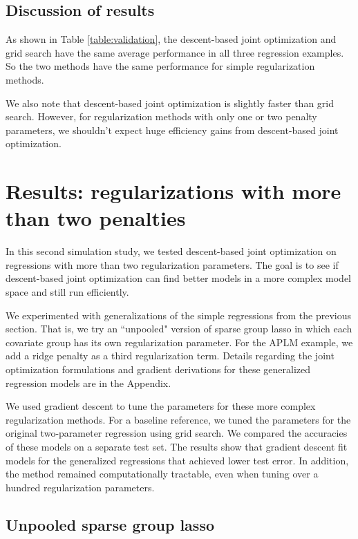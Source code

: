 \documentclass[10pt,letterpaper]{article}
\begin{document}
\subsection{Discussion of results}

As shown in Table \ref{table:validation}, the descent-based joint optimization and grid search have the same average performance in all three regression examples. So the two methods have the same performance for simple regularization methods.

We also note that descent-based joint optimization is slightly faster than grid search. However, for regularization methods with only one or two penalty parameters, we shouldn't expect huge efficiency gains from descent-based joint optimization.

\section{Results: regularizations with more than two penalties}

In this second simulation study, we tested descent-based joint optimization on regressions with more than two regularization parameters. The goal is to see if descent-based joint optimization can find better models in a more complex model space and still run efficiently.

We experimented with generalizations of the simple regressions from the previous section. That is, we try an ``unpooled" version of sparse group lasso in which each covariate group has its own regularization parameter. For the APLM example, we add a ridge penalty as a third regularization term. Details regarding the joint optimization formulations and gradient derivations for these generalized regression models are in the Appendix.

We used gradient descent to tune the parameters for these more complex regularization methods. For a baseline reference, we tuned the parameters for the original two-parameter regression using grid search. We compared the accuracies of these models on a separate test set. The results show that gradient descent fit models for the generalized regressions that achieved lower test error. In addition, the method remained computationally tractable, even when tuning over a hundred regularization parameters.

\subsection{Unpooled sparse group lasso}
\end{document}
